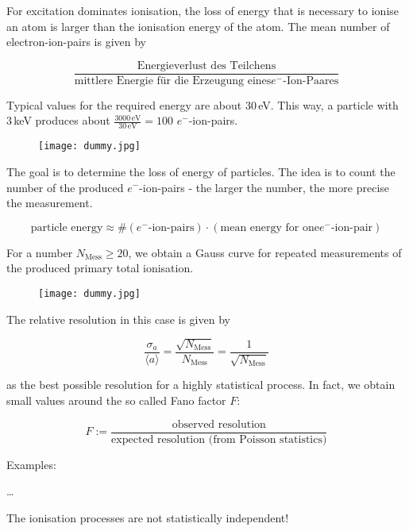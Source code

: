 For excitation dominates ionisation, the loss of energy that is necessary to ionise an atom is
larger than the ionisation energy of the atom. The mean number of electron-ion-pairs is given by 

\[\frac{\text{Energieverlust des Teilchens}}{\text{mittlere Energie für die Erzeugung eines
$e^-$-Ion-Paares}} \]

Typical values for the required energy are about $30\,$eV. This way, a particle with $3\,$keV
produces about $\frac{3000\,\text{eV}}{30\,\text{eV}}=100$ $e^-$-ion-pairs.

\begin{figure}[H]
	\centering
	\texttt{[image: dummy.jpg]}
\end{figure}

The goal is to determine the loss of energy of particles. The idea is to count the number of the
produced $e^-$-ion-pairs - the larger the number, the more precise the measurement. 

\[\text{particle energy}\approx \#(\text{$e^-$-ion-pairs})\cdot (\text{mean energy for one
$e^-$-ion-pair})\]

For a number $N_{\text{Mess}}\ge 20$, we obtain a Gauss curve for repeated measurements of the
produced primary total ionisation.

\begin{figure}[H]
	\centering
	\texttt{[image: dummy.jpg]}
\end{figure}

The relative resolution in this case is given by

\[\frac{\sigma_{a}}{\langle a \rangle} =
\frac{\sqrt{N_{\text{Mess}}}}{N_{\text{Mess}}}=\frac{1}{\sqrt{N_{\text{Mess}}}}
\]

as the best possible resolution for a highly statistical process. In fact, we obtain small values
around the so called Fano factor $F$:

\[ F:=\frac{\text{observed resolution}}{\text{expected resolution (from Poisson statistics)}} \]

Examples:

\ldots

The ionisation processes are not statistically independent!
